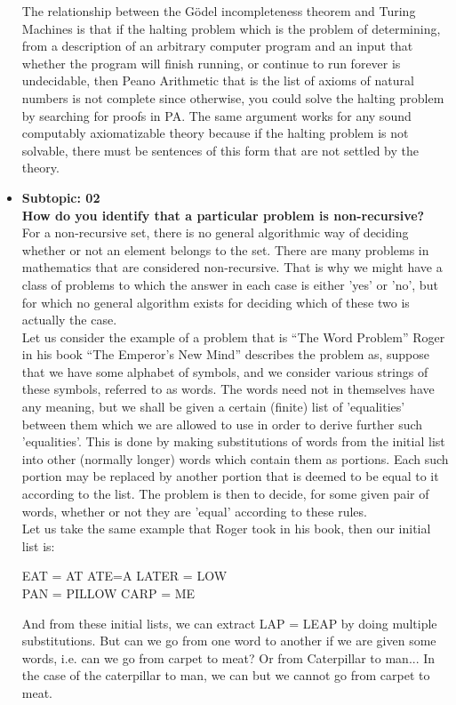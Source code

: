 \documentclass[a4page]{exam}
\newcommand\tab[1][1cm]{\hspace*{#1}}
\begin{document}
\begin{itemize}
\tab
The relationship between the Gödel incompleteness theorem and Turing Machines is that if the halting problem which is the problem of determining, from a description of an arbitrary computer program and an input that whether the program will finish running, or continue to run forever is undecidable, then Peano Arithmetic that is the list of axioms of natural numbers is not complete since otherwise, you could solve the halting problem by searching for proofs in PA. The same argument works for any sound computably axiomatizable theory because if the halting problem is not solvable, there must be sentences of this form that are not settled by the theory.   

    \item \textbf{Subtopic: 02\\ How do you identify that a particular problem is non-recursive?}\\
    \tab
    For a non-recursive set, there is no general algorithmic way of deciding whether or not an element belongs to the set. There are many problems in mathematics that are considered non-recursive. That is why we might have a class of problems to which the answer in each case is either 'yes' or 'no', but for which no general algorithm exists for deciding which of these two is actually the case.\\ \tab
Let us consider the example of a problem that is “The Word Problem” Roger in his book “The Emperor’s New Mind” describes the problem as, suppose that we have some alphabet of symbols, and we consider various strings of these symbols, referred to as words. The words need not in themselves have any meaning, but we shall be given a certain (finite) list of 'equalities' between them which we are allowed to use in order to derive further such 'equalities'. This is done by making substitutions of words from the initial list into other (normally longer) words which contain them as portions. Each such portion may be replaced by another portion that is deemed to be equal to it according to the list. The problem is then to decide, for some given pair of words, whether or not they are 'equal' according to these rules. \\ \tab
Let us take the same example that Roger took in his book, then our initial list is:
\begin{center}
    EAT = AT ATE=A LATER = LOW \\
PAN = PILLOW CARP = ME
\end{center}
\tab
And from these initial lists, we can extract LAP = LEAP by doing multiple substitutions. But can we go from one word to another if we are given some words, i.e. can we go from carpet to meat? Or from Caterpillar to man... In the case of the caterpillar to man, we can but we cannot go from carpet to meat. \\ \tab

\end{itemize}
\end{document}
